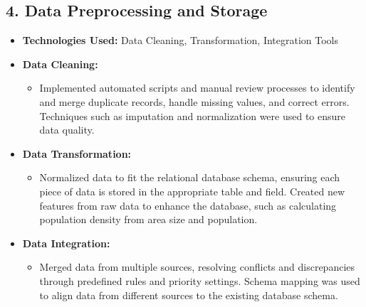 \subsection{4. Data Preprocessing and Storage}
\begin{itemize}
    \item \textbf{Technologies Used:} Data Cleaning, Transformation, Integration Tools
    \item \textbf{Data Cleaning:}
        \begin{itemize}
            \item Implemented automated scripts and manual review processes to identify and merge duplicate records, handle missing values, and correct errors. Techniques such as imputation and normalization were used to ensure data quality.
        \end{itemize}
    \item \textbf{Data Transformation:}
        \begin{itemize}
            \item Normalized data to fit the relational database schema, ensuring each piece of data is stored in the appropriate table and field. Created new features from raw data to enhance the database, such as calculating population density from area size and population.
        \end{itemize}
    \item \textbf{Data Integration:}
        \begin{itemize}
            \item Merged data from multiple sources, resolving conflicts and discrepancies through predefined rules and priority settings. Schema mapping was used to align data from different sources to the existing database schema.
        \end{itemize}
\end{itemize}

